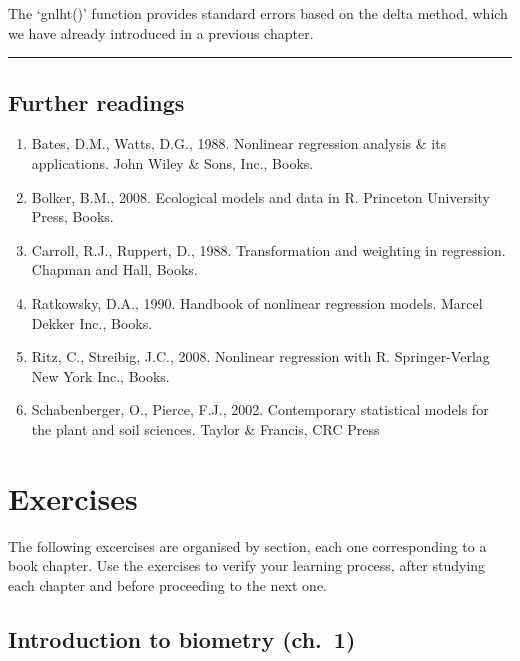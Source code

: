 \documentclass[a4paper,12pt,oneside]{book}
\providecommand{\tightlist}{%
  \setlength{\itemsep}{0pt}\setlength{\parskip}{0pt}}
\begin{document}
The `gnlht()' function provides standard errors based on the delta method, which we have already introduced in a previous chapter.

\begin{center}\rule{0.5\linewidth}{0.5pt}\end{center}

\hypertarget{further-readings-11}{%
\section{Further readings}\label{further-readings-11}}

\begin{enumerate}
\def\labelenumi{\arabic{enumi}.}
\tightlist
\item
  Bates, D.M., Watts, D.G., 1988. Nonlinear regression analysis \& its applications. John Wiley \& Sons, Inc., Books.
\item
  Bolker, B.M., 2008. Ecological models and data in R. Princeton University Press, Books.
\item
  Carroll, R.J., Ruppert, D., 1988. Transformation and weighting in regression. Chapman and Hall, Books.
\item
  Ratkowsky, D.A., 1990. Handbook of nonlinear regression models. Marcel Dekker Inc., Books.
\item
  Ritz, C., Streibig, J.C., 2008. Nonlinear regression with R. Springer-Verlag New York Inc., Books.
\item
  Schabenberger, O., Pierce, F.J., 2002. Contemporary statistical models for the plant and soil sciences. Taylor \& Francis, CRC Press
\end{enumerate}

\hypertarget{exercises}{%
\chapter{Exercises}\label{exercises}}

The following excercises are organised by section, each one corresponding to a book chapter. Use the exercises to verify your learning process, after studying each chapter and before proceeding to the next one.

\hypertarget{introduction-to-biometry-ch.-1}{%
\section{Introduction to biometry (ch.~1)}\label{introduction-to-biometry-ch.-1}}
\end{document}
